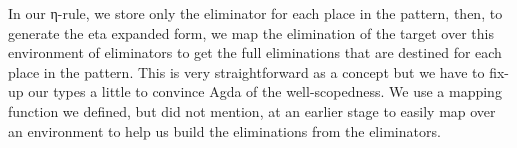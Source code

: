 In our η-rule, we store only the eliminator for each place in the pattern,
then, to generate the eta expanded form, we map the elimination of the target
over this environment of eliminators to get the full eliminations that
are destined for each place in the pattern. This is very straightforward
as a concept but we have to fix-up our types a little to convince
Agda of the well-scopedness. We use a mapping function we defined, but did not
mention, at an earlier stage to easily map over an environment to help us
build the eliminations from the eliminators.
\begin{code}%
\>[0]\AgdaSpace{}%
\AgdaSpace{}%
\AgdaSymbol{:}\AgdaSpace{}%
\AgdaSpace{}%
\<%
\\
\>[0][@{}l@{\AgdaIndent{0}}]%
\>[2]\AgdaSpace{}%
\<%
\\
%
\\[\AgdaEmptyExtraSkip]%
%
\>[2]\<%
\\
\>[2][@{}l@{\AgdaIndent{0}}]%
\>[4]%
\>[17]\AgdaSymbol{:}%
\>[20]\<%
\\
%
\>[4]%
\>[17]\AgdaSymbol{:}%
\>[20]\AgdaSpace{}%
\AgdaSpace{}%
\<%
\\
%
\>[2]\AgdaSpace{}%
\AgdaSymbol{=}\AgdaSpace{}%
\AgdaSpace{}%
\<%
\\
%
\\[\AgdaEmptyExtraSkip]%
%
\>[2]\AgdaSpace{}%
\AgdaSymbol{:}\AgdaSpace{}%
\AgdaSymbol{(}\AgdaSpace{}%
\AgdaSpace{}%
\AgdaSymbol{:}\AgdaSpace{}%
\AgdaSpace{}%
\AgdaSymbol{)}\AgdaSpace{}%
\AgdaSpace{}%
\AgdaSymbol{(}\AgdaSpace{}%
\AgdaSpace{}%
\AgdaSymbol{)}\AgdaSpace{}%
\<%
\\
%
\>[2]\AgdaSpace{}%
\AgdaSymbol{\{}\AgdaSymbol{\}}\AgdaSpace{}%
\AgdaSpace{}%
\<%
\\
\>[2][@{}l@{\AgdaIndent{0}}]%
\>[4]\AgdaSymbol{=}%
\>[87I]\<%
\\
\>[87I][@{}l@{\AgdaIndent{0}}]%
\>[8]\AgdaSpace{}%
\AgdaSymbol{\{}\AgdaSymbol{\}}\AgdaSpace{}%

\end{code}
